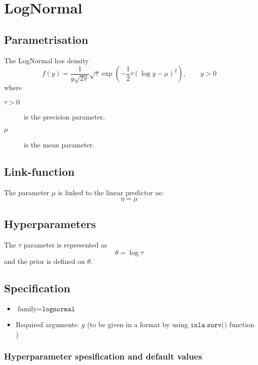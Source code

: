 \documentclass[a4paper,11pt]{article}
\begin{document}
\section*{LogNormal}

\subsection*{Parametrisation}

The LogNormal has density
\begin{displaymath}
    f(y) = \frac{1}{y\sqrt{2\pi}} \sqrt{\tau} \exp\left(
      -\frac{1}{2} \tau (\log y - \mu)^{2}
    \right), \qquad y > 0
\end{displaymath}
where
\begin{description}
\item[$\tau > 0$] is the precision parameter,
\item[$\mu$] is the mean parameter.
\end{description}

\subsection*{Link-function}

The parameter $\mu$ is linked to the linear predictor as:
\[
\eta = \mu
\]
\subsection*{Hyperparameters}

The $\tau$ parameter is represented as
\[
\theta = \log\tau
\]
and the prior is defined on $\theta$.

\subsection*{Specification}

\begin{itemize}
\item $\text{family}=\texttt{lognormal}$
\item Required arguments: $y$ (to be given in a format by using
    $\texttt{inla.surv()}$ function )
\end{itemize}

\subsubsection*{Hyperparameter spesification and default values}

\end{document}
